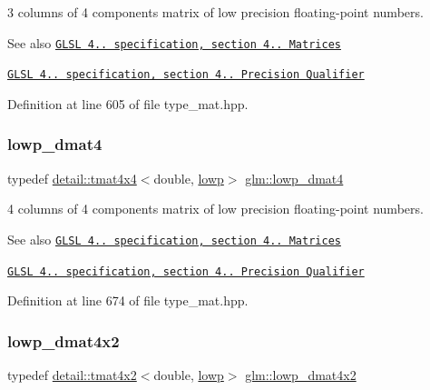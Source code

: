 3 columns of 4 components matrix of low precision floating-\/point numbers.

\begin{DoxySeeAlso}{See also}
\href{http://www.opengl.org/registry/doc/GLSLangSpec.4.20.8.pdf}{\tt G\+L\+SL 4.. specification, section 4.. Matrices} 

\href{http://www.opengl.org/registry/doc/GLSLangSpec.4.20.8.pdf}{\tt G\+L\+SL 4.. specification, section 4.. Precision Qualifier} 
\end{DoxySeeAlso}


Definition at line 605 of file type\+\_\+mat.\+hpp.

\mbox{\label{group__core__precision_gaea69794db4e619881b77d37bf84b337e}} 
\subsubsection{\texorpdfstring{lowp\+\_\+dmat4}{lowp\_dmat4}}
{\footnotesize\ttfamily typedef \hyperlink{structglm_1_1detail_1_1tmat4x4}{detail\+::tmat4x4}$<$double, \hyperlink{namespaceglm_a0f04f086094c747d227af4425893f545ae161af3fc695e696ce3bf69f7332bc2d}{lowp}$>$ \hyperlink{group__core__precision_gaea69794db4e619881b77d37bf84b337e}{glm\+::lowp\+\_\+dmat4}}

4 columns of 4 components matrix of low precision floating-\/point numbers.

\begin{DoxySeeAlso}{See also}
\href{http://www.opengl.org/registry/doc/GLSLangSpec.4.20.8.pdf}{\tt G\+L\+SL 4.. specification, section 4.. Matrices} 

\href{http://www.opengl.org/registry/doc/GLSLangSpec.4.20.8.pdf}{\tt G\+L\+SL 4.. specification, section 4.. Precision Qualifier} 
\end{DoxySeeAlso}


Definition at line 674 of file type\+\_\+mat.\+hpp.

\mbox{\label{group__core__precision_ga28a7ef670069c3707f19b9de1039517e}} 
\subsubsection{\texorpdfstring{lowp\+\_\+dmat4x2}{lowp\_dmat4x2}}
{\footnotesize\ttfamily typedef \hyperlink{structglm_1_1detail_1_1tmat4x2}{detail\+::tmat4x2}$<$double, \hyperlink{namespaceglm_a0f04f086094c747d227af4425893f545ae161af3fc695e696ce3bf69f7332bc2d}{lowp}$>$ \hyperlink{group__core__precision_ga28a7ef670069c3707f19b9de1039517e}{glm\+::lowp\+\_\+dmat4x2}}

